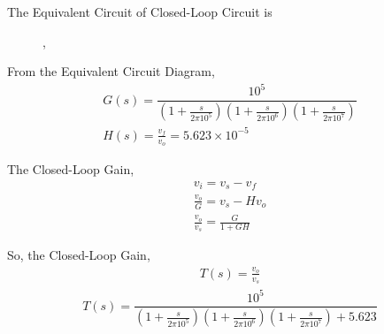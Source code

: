 \begin{enumerate}[label=\thesection.\arabic*.,ref=\thesection.\theenumi]
The Equivalent Circuit of Closed-Loop Circuit is
\begin{figure}[ht!]
	\begin{center}
		\resizebox{\columnwidth}{!}{}
	\end{center},
	\caption{}
	\label{fig:ee18btech11014_Closed-Loop Equivalent Circuit}
\end{figure}

From the Equivalent Circuit Diagram,
\begin{align}
G(s) = \dfrac{10^5}{\left(1+\frac{s}{2\pi 10^{5}}\right)\left(1+\frac{s}{2\pi 10^{6}}\right)\left(1+\frac{s}{2\pi 10^{7}}\right)}\\
H(s) = \frac{v_{f}}{v_{o}} = 5.623 \times 10^{-5}
\end{align}

The Closed-Loop Gain,
\begin{align}
v_{i} = v_{s} - v_{f}\\
\frac{v_{o}}{G} = v_{s} - Hv_{o}\\
\frac{v_{o}}{v_{s}} = \frac{G}{1+GH}
\end{align}

So, the Closed-Loop Gain,
\begin{align}
T(s) = \frac{v_{o}}{v_{s}}
\end{align}
\begin{align}
T(s) = \dfrac{10^5}{\left(1+\frac{s}{2\pi 10^{5}}\right)\left(1+\frac{s}{2\pi 10^{6}}\right)\left(1+\frac{s}{2\pi 10^{7}}\right)+5.623}
\end{align}

\end{enumerate}
